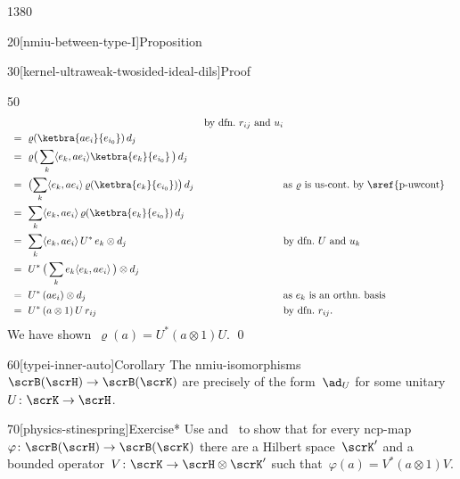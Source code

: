 \begin{parsec}{1380}
\begin{point}{20}[nmiu-between-type-I]{Proposition}
\begin{point}{30}[kernel-ultraweak-twosided-ideal-dils]{Proof}
\begin{point}{50}
\begin{align*}
            &\qquad&\text{by dfn.~$r_{ij}$ and~$u_i$}\\
        & \ = \ \varrho(\ketbra{a e_i}{e_{i_0}}) \,d_j \\
        & \ = \ \varrho\bigl(\, \sum_k \langle e_k, ae_i \rangle
                    \ketbra{e_k}{e_{i_0}} \, \bigr)\,d_j  \\
        & \ = \ \bigl( \sum_k  \langle e_k, ae_i \rangle
                    \, \varrho(\ketbra{e_k}{e_{i_0}})\bigr)\,d_j 
                    &&\text{as $\varrho$ is us-cont.~by~\sref{p-uwcont}} \\
        & \ = \  \sum_k  \langle e_k, ae_i \rangle
                    \, \varrho(\ketbra{e_k}{e_{i_0}})\,d_j \\
        & \ = \ \sum_k  \langle e_k, ae_i \rangle
                    \, U^*\, e_k\otimes d_j 
                    && \text{by dfn.~$U$ and~$u_k$}\\
        & \ = \  U^*\,  \bigl(\, \sum_k e_k \langle e_k, ae_i \rangle 
                   \, \bigr)  \otimes d_j\\
        & \ = \  U^*\,  (ae_i) \otimes d_j 
                   && \text{as $e_k$ is an orthn.~basis}\\
        & \ = \  U^*\,  (a \otimes 1) \, U \, r_{ij} && \text{by dfn.~$r_{ij}$.}
\end{align*}
\endgroup
We have shown~$\varrho(a) = U^* (a \otimes 1) U$. \qed
\end{point}
\end{point}
\begin{point}{60}[typei-inner-auto]{Corollary}%
The nmiu-isomorphisms~$\scrB(\scrH) \to \scrB(\scrK)$
    are precisely of the form~$\ad_U$
    for some unitary~$U\colon \scrK \to \scrH$.
\end{point}
\end{point}
\begin{point}{70}[physics-stinespring]{Exercise*}%
Use  and~ to show
    that for every ncp-map~$\varphi\colon \scrB(\scrH) \to \scrB(\scrK)$
    there are a Hilbert space~$\scrK'$
    and a bounded operator~$V\colon \scrK \to \scrH \otimes \scrK'$
    such that~$\varphi(a) = V^* (a \otimes 1)V$.


\end{point}
\end{parsec}
